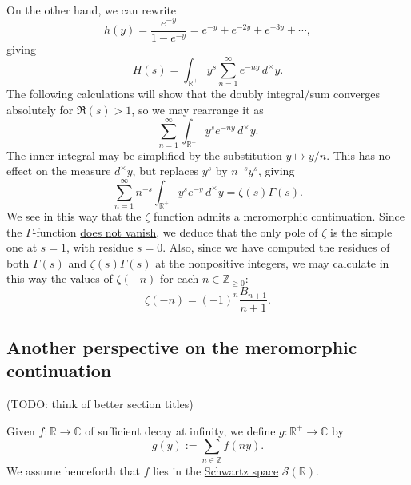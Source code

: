 \documentclass[reqno]{amsart}  \numberwithin{theorem}{section} \numberwithin{equation}{section}
\begin{document}
On the other hand, we can rewrite
\begin{equation*}
  h(y) = \frac{e^{- y}}{ 1 - e^{- y}}
  = e^{- y } + e^{- 2 y } + e^{- 3 y} + \dotsb,
\end{equation*}
giving
\begin{equation*}
  H(s) = \int_{\mathbb{R}^+ } y^s \sum_{n = 1 }^\infty e^{- n y } \,d^\times y.
\end{equation*}
The following calculations will show that the doubly integral/sum converges absolutely for $\Re(s) > 1$, so we may rearrange it as
\begin{equation*}
  \sum_{n = 1 }^\infty \int_{\mathbb{R}^+ } y^s e^{- n y } \,d^\times y.
\end{equation*}
The inner integral may be simplified by the substitution $y \mapsto y /n$.  This has no effect on the measure $d^\times y$, but replaces $y^s$ by $n^{-s} y^s$, giving
\begin{equation*}
  \sum_{n = 1 }^\infty n^{- s} \int_{\mathbb{R}^+ } y^s e^{- y } \,d^\times y
  = \zeta(s) \Gamma(s).
\end{equation*}
We see in this way that the $\zeta$ function admits a meromorphic continuation.  Since the $\Gamma$-function \href{https://www.proofwiki.org/wiki/Zeroes_of_Gamma_Function}{does not vanish}, we deduce that the only pole of $\zeta$ is the simple one at $s=1$, with residue $s=0$.  Also, since we have computed the residues of both $\Gamma(s)$ and $\zeta(s) \Gamma(s)$ at the nonpositive integers, we may calculate in this way the values of $\zeta(-n)$ for each $n \in \mathbb{Z}_{\geq 0}$:
\begin{equation*}
  \zeta(-n) = (-1)^n \frac{B_{n + 1}}{ n + 1}.
\end{equation*}

\subsection{Another perspective on the meromorphic continuation}\label{sec:cj4vkkark8}
(TODO: think of better section titles)

Given $f : \mathbb{R} \rightarrow \mathbb{C}$ of sufficient decay at infinity, we define $g : \mathbb{R}^+ \rightarrow \mathbb{C} $ by
\begin{equation*}
  g(y) := \sum_{n \in \mathbb{Z} } f(n y).
\end{equation*}
We assume henceforth that $f$ lies in the \href{https://en.wikipedia.org/wiki/Schwartz_space}{Schwartz space} $\mathcal{S}(\mathbb{R})$.
\end{document}
